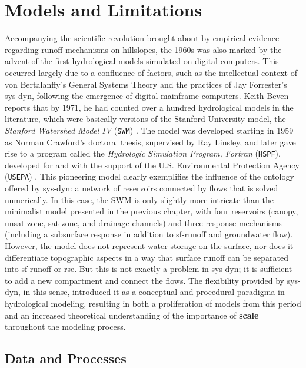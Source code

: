 \documentclass[./main_en.tex]{subfiles}
\begin{document}
\section{Models and Limitations} \label{sec:hydro:others}

\par Accompanying the scientific revolution brought about by empirical evidence regarding runoff mechanisms on hillslopes, the 1960s was also marked by the advent of the first hydrological models simulated on digital computers. This occurred largely due to a confluence of factors, such as the intellectual context of von Bertalanffy's General Systems Theory and the practices of Jay Forrester's \gls{sys-dyn}, following the emergence of digital mainframe computers. Keith Beven reports that by 1971, he had counted over a hundred hydrological models in the literature, which were basically versions of the Stanford University \gls{model}, the \textit{Stanford Watershed Model IV} (\texttt{SWM}) \cite{Beven2019a}. The \gls{model} was developed starting in 1959 as Norman Crawford's doctoral thesis, supervised by Ray Linsley, and later gave rise to a program called the \textit{Hydrologic Simulation Program, Fortran} (\texttt{HSPF}), developed for and with the support of the U.S. Environmental Protection Agency (\texttt{USEPA}) \cite{Burges2004a}. This pioneering \gls{model} clearly exemplifies the influence of the ontology offered by \gls{sys-dyn}: a network of reservoirs connected by flows that is solved numerically. In this case, the SWM is only slightly more intricate than the minimalist \gls{model} presented in the previous chapter, with four reservoirs (canopy, \gls{unsat-zone}, \gls{sat-zone}, and drainage channels) and three response mechanisms (including a subsurface response in addition to \gls{sf-runoff} and groundwater flow). However, the \gls{model} does not represent water storage on the surface, nor does it differentiate topographic aspects in a way that surface runoff can be separated into \gls{sf-runoff} or \gls{rse}. But this is not exactly a problem in \gls{sys-dyn}; it is sufficient to add a new compartment and connect the flows. The flexibility provided by \gls{sys-dyn}, in this sense, introduced it as a conceptual and procedural \gls{paradigma} in hydrological modeling, resulting in both a proliferation of models from this period and an increased theoretical understanding of the importance of \textbf{scale} throughout the modeling process.

\subsection{Data and Processes} \label{sec:hydro:databased}
\end{document}
